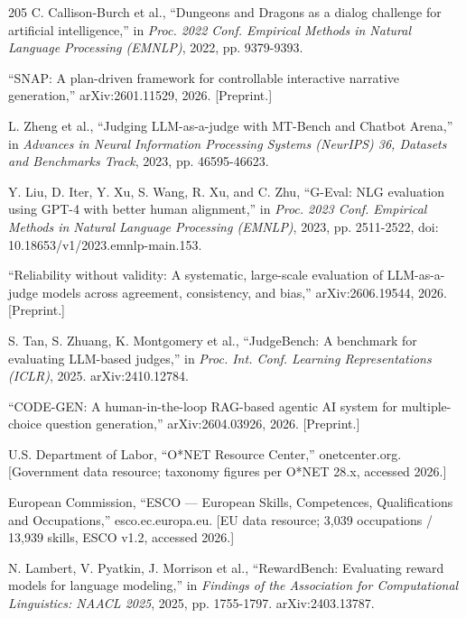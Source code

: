 \begin{thebibliography}{205}
 C. Callison-\allowbreak{}Burch et al., ``Dungeons and Dragons as a dialog challenge for artificial intelligence,'' in \textit{Proc. 2022 Conf. Empirical Methods in Natural Language Processing (EMNLP)}, 2022, pp. 9379-9393.

 ``SNAP: A plan-driven framework for controllable interactive narrative generation,'' arXiv:2601.\allowbreak{}11529, 2026. [Preprint.]

 L. Zheng et al., ``Judging LLM-\allowbreak{}as-\allowbreak{}a-\allowbreak{}judge with MT-Bench and Chatbot Arena,'' in \textit{Advances in Neural Information Processing Systems (NeurIPS) 36, Datasets and Benchmarks Track}, 2023, pp. 46595-\allowbreak{}46623.

 Y. Liu, D. Iter, Y. Xu, S. Wang, R. Xu, and C. Zhu, ``G-Eval: NLG evaluation using GPT-4 with better human alignment,'' in \textit{Proc. 2023 Conf. Empirical Methods in Natural Language Processing (EMNLP)}, 2023, pp. 2511-2522, doi: 10.\allowbreak{}18653/\allowbreak{}v1/\allowbreak{}2023.\allowbreak{}emnlp-\allowbreak{}main.\allowbreak{}153.

 ``Reliability without validity: A systematic, large-scale evaluation of LLM-\allowbreak{}as-\allowbreak{}a-\allowbreak{}judge models across agreement, consistency, and bias,'' arXiv:2606.\allowbreak{}19544, 2026. [Preprint.]

 S. Tan, S. Zhuang, K. Montgomery et al., ``JudgeBench: A benchmark for evaluating LLM-based judges,'' in \textit{Proc. Int. Conf. Learning Representations (ICLR)}, 2025. arXiv:2410.\allowbreak{}12784.

 ``CODE-GEN: A human-\allowbreak{}in-\allowbreak{}the-\allowbreak{}loop RAG-based agentic AI system for multiple-\allowbreak{}choice question generation,'' arXiv:2604.\allowbreak{}03926, 2026. [Preprint.]

 U.S. Department of Labor, ``O*NET Resource Center,'' onetcenter.\allowbreak{}org. [Government data resource; taxonomy figures per O*NET 28.x, accessed 2026.]

 European Commission, ``ESCO --- European Skills, Competences, Qualifications and Occupations,'' esco.\allowbreak{}ec.\allowbreak{}europa.\allowbreak{}eu. [EU data resource; 3,039 occupations / 13,939 skills, ESCO v1.2, accessed 2026.]

 N. Lambert, V. Pyatkin, J. Morrison et al., ``RewardBench: Evaluating reward models for language modeling,'' in \textit{Findings of the Association for Computational Linguistics: NAACL 2025}, 2025, pp. 1755-1797. arXiv:2403.\allowbreak{}13787.


\end{thebibliography}
